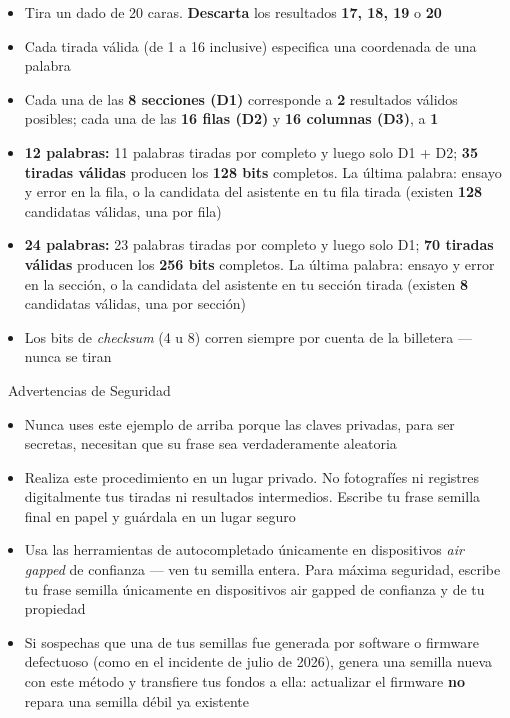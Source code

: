 \documentclass[10pt]{article}
\begin{document}
\begin{itemize}[itemsep=1pt]
 \item Tira un dado de 20 caras. \textbf{Descarta} los resultados \textbf{17, 18, 19} o \textbf{20}
 \item Cada tirada válida (de 1 a 16 inclusive) especifica una coordenada de una palabra
 \item Cada una de las \textbf{8 secciones (D1)} corresponde a \textbf{2} resultados válidos posibles; cada una de las \textbf{16 filas (D2)} y \textbf{16 columnas (D3)}, a \textbf{1}
 \item \textbf{12 palabras:} 11 palabras tiradas por completo y luego solo D1 + D2; \textbf{35 tiradas válidas} producen los \textbf{128 bits} completos. La última palabra: ensayo y error en la fila, o la candidata del asistente en tu fila tirada (existen \textbf{128} candidatas válidas, una por fila)
 \item \textbf{24 palabras:} 23 palabras tiradas por completo y luego solo D1; \textbf{70 tiradas válidas} producen los \textbf{256 bits} completos. La última palabra: ensayo y error en la sección, o la candidata del asistente en tu sección tirada (existen \textbf{8} candidatas válidas, una por sección)
 \item Los bits de \textit{checksum} (4 u 8) corren siempre por cuenta de la billetera --- nunca se tiran
\end{itemize}

\begin{warnbox}{\faExclamationTriangle~Advertencias de Seguridad}
\begin{itemize}[itemsep=1pt]
 \item Nunca uses este ejemplo de arriba porque las claves privadas, para ser secretas, necesitan que su frase sea verdaderamente aleatoria
 \item Realiza este procedimiento en un lugar privado. No fotografíes ni registres digitalmente tus tiradas ni resultados intermedios. Escribe tu frase semilla final en papel y guárdala en un lugar seguro
 \item Usa las herramientas de autocompletado únicamente en dispositivos \textit{air gapped} de confianza --- ven tu semilla entera. Para máxima seguridad, escribe tu frase semilla únicamente en dispositivos air gapped de confianza y de tu propiedad
 \item Si sospechas que una de tus semillas fue generada por software o firmware defectuoso (como en el incidente de julio de 2026), genera una semilla nueva con este método y transfiere tus fondos a ella: actualizar el firmware \textbf{no} repara una semilla débil ya existente
\end{itemize}
\end{warnbox}
\end{document}

